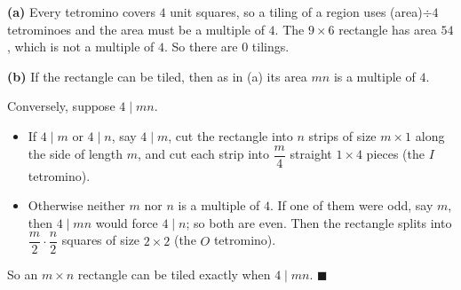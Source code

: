\textbf{(a)} Every tetromino covers $4$ unit squares, so a tiling of a region uses (area)$\div4$ tetrominoes and the area must be a multiple of $4$. The $9\times6$ rectangle has area $54$, which is not a multiple of $4$. So there are $\boxed{0}$ tilings.

\textbf{(b)} If the rectangle can be tiled, then as in (a) its area $mn$ is a multiple of $4$.

Conversely, suppose $4\mid mn$.
\begin{itemize}
\item If $4\mid m$ or $4\mid n$, say $4\mid m$, cut the rectangle into $n$ strips of size $m\times1$ along the side of length $m$, and cut each strip into $\dfrac m4$ straight $1\times4$ pieces (the $I$ tetromino).
\item Otherwise neither $m$ nor $n$ is a multiple of $4$. If one of them were odd, say $m$, then $4\mid mn$ would force $4\mid n$; so both are even. Then the rectangle splits into $\dfrac m2\cdot\dfrac n2$ squares of size $2\times2$ (the $O$ tetromino).
\end{itemize}
So an $m\times n$ rectangle can be tiled exactly when $4\mid mn$. $\blacksquare$
